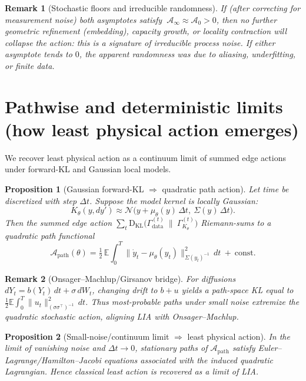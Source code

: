 \documentclass[11pt]{article}
\newtheorem{proposition}{Proposition}
\newtheorem{remark}{Remark}
\newcommand{\E}{\mathbb{E}}
\newcommand{\KL}{\mathrm{D}_{\mathrm{KL}}}
\newcommand{\1}{\mathbf{1}}
\begin{document}
\begin{remark}[Stochastic floors and irreducible randomness]
If (after correcting for measurement noise) both asymptotes satisfy
\(\ \mathcal A_\infty \approx \mathcal A_0 > 0\), then no further geometric refinement (embedding), capacity growth, or locality contraction will collapse the action: this is a \emph{signature of irreducible process noise}. If either asymptote tends to \(0\), the apparent randomness was due to aliasing, underfitting, or finite data.
\end{remark}

\section{Pathwise and deterministic limits (how least physical action emerges)}
We recover least physical action as a continuum limit of summed edge actions under forward-KL and Gaussian local models.
\begin{proposition}[Gaussian forward-KL $\Rightarrow$ quadratic path action]
Let time be discretized with step \(\Delta t\). Suppose the model kernel is locally Gaussian:
\[
K_\theta(y,dy') \approx \mathcal N\!\big(y+\mu_\theta(y)\,\Delta t,\ \Sigma(y)\,\Delta t\big).
\]
Then the summed edge action \(\sum_t \KL\big(\Gamma_{\text{data}}^{(t)}\ \|\ \Gamma_{K_\theta}^{(t)}\big)\)
Riemann-sums to a quadratic path functional
\[
\mathcal A_{\mathrm{path}}(\theta)
= \tfrac12\,\E\!\int_0^T \big\|\dot y_t-\mu_\theta(y_t)\big\|^2_{\Sigma(y_t)^{-1}}\,dt\ +\ \text{const}.
\]
\end{proposition}

\begin{remark}[Onsager--Machlup/Girsanov bridge]
For diffusions \(dY_t=b(Y_t)\,dt+\sigma\,dW_t\), changing drift to \(b+u\) yields a path-space KL equal to
\(\tfrac12\E\!\int_0^T \|u_t\|^2_{(\sigma\sigma^\top)^{-1}}\,dt\). Thus most-probable paths under small noise extremize the quadratic stochastic action, aligning LIA with Onsager--Machlup.
\end{remark}

\begin{proposition}[Small-noise/continuum limit $\Rightarrow$ least physical action]
In the limit of vanishing noise and \(\Delta t\to 0\), stationary paths of \(\mathcal A_{\mathrm{path}}\) satisfy Euler--Lagrange/Hamilton--Jacobi equations associated with the induced quadratic Lagrangian. Hence classical least action is recovered as a limit of LIA.
\end{proposition}
\end{document}
